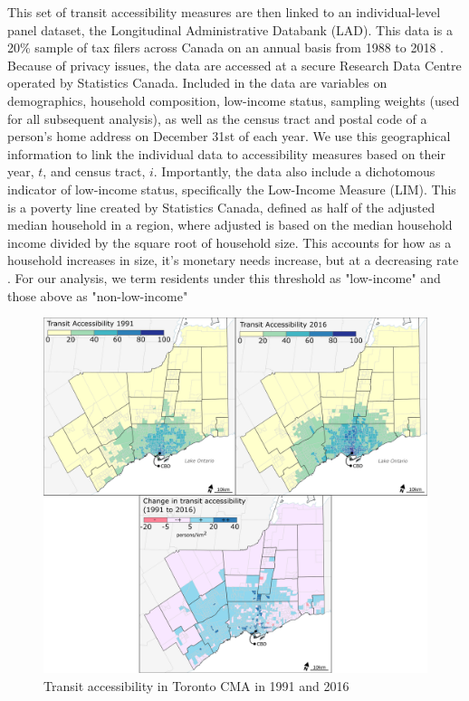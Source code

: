 This set of transit accessibility measures are then linked to an individual-level panel dataset, the Longitudinal Administrative Databank (LAD). This data is a 20\% sample of tax filers across Canada on an annual basis from 1988 to 2018 \cite{government_of_canada_longitudinal_2020}. Because of privacy issues, the data are accessed at a secure Research Data Centre operated by Statistics Canada. Included in the data are variables on demographics, household composition, low-income status, sampling weights (used for all subsequent analysis), as well as the census tract and postal code of a person's home address on December 31st of each year. We use this geographical information to link the individual data to accessibility measures based on their year, $t$, and census tract, $i$. Importantly, the data also include a dichotomous indicator of low-income status, specifically the Low-Income Measure (LIM). This is a poverty line created by Statistics Canada, defined as half of the adjusted median household in a region, where adjusted is based on the median household income divided by the square root of household size. This accounts for how as a household increases in size, it's monetary needs increase, but at a decreasing rate \cite{government_of_canada_longitudinal_2020}. For our analysis, we term residents under this threshold as "low-income" and those above as "non-low-income"

\begin{figure}[H]
	\centering
	\includegraphics[width=1\linewidth]{figures/acces_mapas.png}
	\caption[]{Transit accessibility in Toronto CMA in 1991 and 2016}
	\label{fig:accessmaps}
\end{figure}



